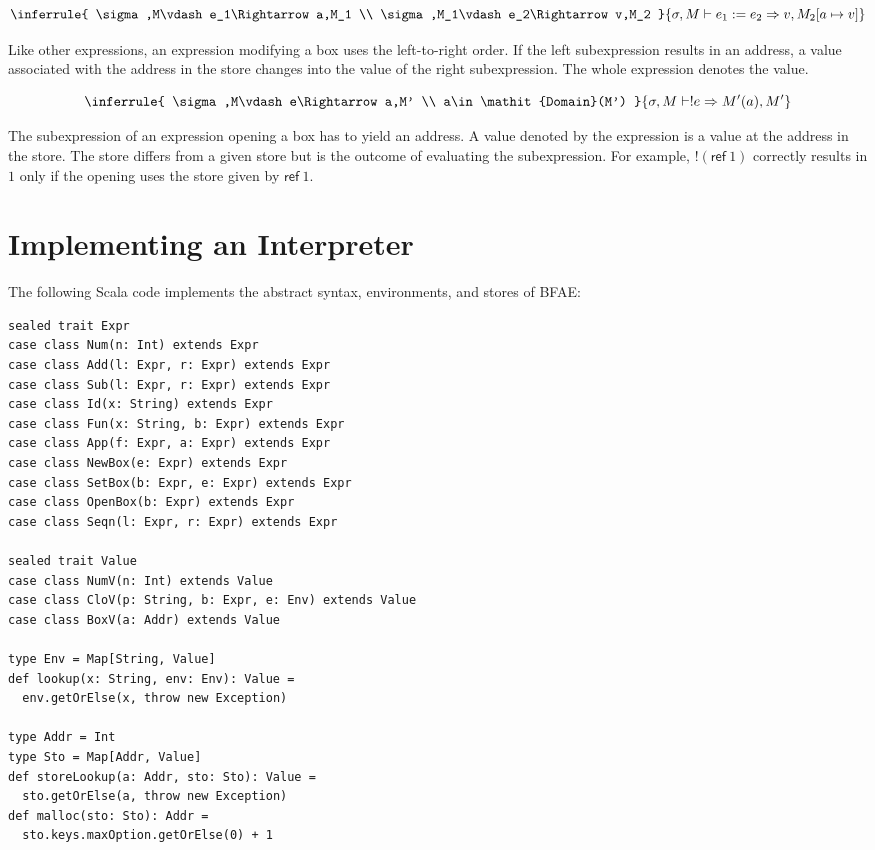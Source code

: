 \[
\inferrule
{ \sigma,M\vdash e_1\Rightarrow a,M_1 \\
  \sigma,M_1\vdash e_2\Rightarrow v,M_2 }
{ \sigma,M\vdash e_1:=e_2\Rightarrow v,M_2\lbrack a\mapsto v\rbrack }
\]

Like other expressions, an expression modifying a box uses the left-to-right
order. If the left subexpression results in an address, a value associated with
the address in the store changes into the value of the right subexpression. The
whole expression denotes the value.

\[
\inferrule
{ \sigma,M\vdash e\Rightarrow a,M' \\
  a\in \mathit{Domain}(M') }
{ \sigma,M\vdash !e\Rightarrow M'(a),M' }
\]

The subexpression of an expression opening a box has to yield an address. A value
denoted by the expression is a value at the address in the store. The store
differs from a given store but is the outcome of evaluating the subexpression.
For example, \(!(\textsf{ref}\ 1)\) correctly results in \(1\) only if the
opening uses the store given by \(\textsf{ref}\ 1\).

\section{Implementing an Interpreter
}

The following Scala code implements the abstract syntax, environments, and stores
of BFAE:

\begin{verbatim}
sealed trait Expr
case class Num(n: Int) extends Expr
case class Add(l: Expr, r: Expr) extends Expr
case class Sub(l: Expr, r: Expr) extends Expr
case class Id(x: String) extends Expr
case class Fun(x: String, b: Expr) extends Expr
case class App(f: Expr, a: Expr) extends Expr
case class NewBox(e: Expr) extends Expr
case class SetBox(b: Expr, e: Expr) extends Expr
case class OpenBox(b: Expr) extends Expr
case class Seqn(l: Expr, r: Expr) extends Expr

sealed trait Value
case class NumV(n: Int) extends Value
case class CloV(p: String, b: Expr, e: Env) extends Value
case class BoxV(a: Addr) extends Value

type Env = Map[String, Value]
def lookup(x: String, env: Env): Value =
  env.getOrElse(x, throw new Exception)

type Addr = Int
type Sto = Map[Addr, Value]
def storeLookup(a: Addr, sto: Sto): Value =
  sto.getOrElse(a, throw new Exception)
def malloc(sto: Sto): Addr =
  sto.keys.maxOption.getOrElse(0) + 1
\end{verbatim}

